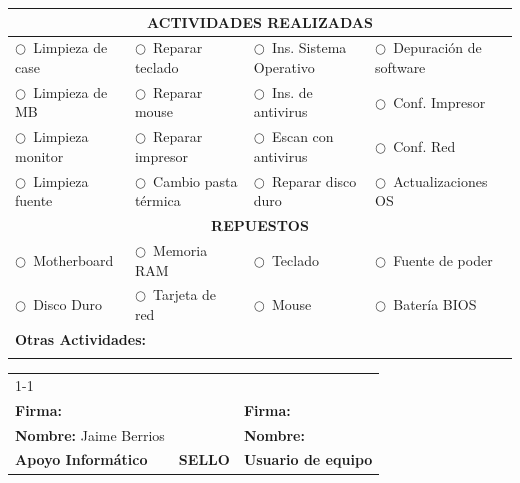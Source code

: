 \documentclass[10pt,letterpaper]{article}
\newcommand{\casilla}{$\bigcirc$}
\newcommand{\cabecera}[1]{\cellcolor{colorcabecera}\textcolor{colortextocabecera}{\textbf{#1}}}
\newcommand{\subcabecera}[1]{\cellcolor{colorfondoseccion}\textbf{#1}}
\begin{document}
\noindent
\begin{tabularx}{\textwidth}{|X X X X|}
\hline
\multicolumn{4}{|c|}{\cabecera{ACTIVIDADES REALIZADAS}} \\
\hline
\casilla\ Limpieza de case & \casilla\ Reparar teclado & \casilla\ Ins. Sistema Operativo & \casilla\ Depuración de software \\
\casilla\ Limpieza de MB & \casilla\ Reparar mouse & \casilla\ Ins. de antivirus & \casilla\ Conf. Impresor \\
\casilla\ Limpieza monitor & \casilla\ Reparar impresor & \casilla\ Escan con antivirus & \casilla\ Conf. Red \\
\casilla\ Limpieza fuente & \casilla\ Cambio pasta térmica & \casilla\ Reparar disco duro & \casilla\ Actualizaciones OS \\
\hline
\multicolumn{4}{|c|}{\subcabecera{REPUESTOS}} \\
\hline
\casilla\ Motherboard & \casilla\ Memoria RAM & \casilla\ Teclado & \casilla\ Fuente de poder \\
\casilla\ Disco Duro & \casilla\ Tarjeta de red & \casilla\ Mouse & \casilla\ Batería BIOS \\
\hline
\multicolumn{4}{|l|}{\textbf{Otras Actividades:} \dotfill} \\
\multicolumn{4}{|l|}{\dotfill} \\
\hline
\end{tabularx}
\vspace{1.5cm}

\noindent
\begin{tabularx}{\textwidth}{X X X}
\cline{1-1} \cline{3-3}
\\
\textbf{Firma:} & & \textbf{Firma:} \\
\textbf{Nombre:} Jaime Berrios & & \textbf{Nombre:} \dotfill \\
\textbf{Apoyo Informático} & \centering \textbf{SELLO} & \textbf{Usuario de equipo}
\end{tabularx}
\end{document}
